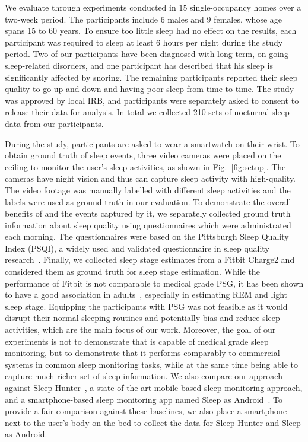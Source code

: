 We evaluate \systemname through experiments conducted in $15$ single-occupancy homes over a two-week period.  The participants include 6 males and 9 females, whose age spans 15 to 60 years. To ensure too little sleep had no effect on the results, each participant was required to sleep at least $6$ hours per night during the study period. Two of our participants have been diagnosed with long-term, on-going sleep-related disorders, and one participant has described that his sleep is significantly affected by snoring. The remaining participants reported their sleep quality to go up and down and having poor sleep from time to time. The study was approved by local IRB, and participants were separately asked to consent to release their data for analysis. In total we collected 210 sets of nocturnal sleep data from our participants. %

During the study, participants are asked to wear a smartwatch on their wrist. To obtain ground truth of sleep events, three video cameras were placed on the ceiling to monitor the user's sleep activities, as shown in Fig.~\ref{fig:setup}. The cameras have night vision and thus can capture sleep activity with high-quality. The video footage was manually labelled with different sleep activities and the labels were used as ground truth in our evaluation. To demonstrate the overall benefits of \systemname and the events captured by it, we separately collected ground truth information about sleep quality using questionnaires which were administrated each morning. The questionnaires were based on the Pittsburgh Sleep Quality Index (PSQI), a widely used and validated questionnaire in sleep quality research~\cite{buysse1989pittsburgh}. Finally, we collected sleep stage estimates from a Fitbit Charge2 and considered them as ground truth for sleep stage estimation. While the performance of Fitbit is not comparable to medical grade PSG, it has been shown to have a good association in adults~\cite{evenson2015systematic,fitbit01,fitbit02,fitbit03}, especially in estimating REM and light sleep stage. Equipping the participants with PSG was not feasible as it would disrupt their normal sleeping routines and potentially bias and reduce sleep activities, which are the main focus of our work. Moreover, the goal of our experiments is not to demonstrate that \systemname is capable of medical grade sleep monitoring, but to demonstrate that it performs comparably to commercial systems in common sleep monitoring tasks, while at the same time being able to capture much richer set of sleep information.  We also compare our approach against Sleep Hunter~\cite{gu2016sleep}, a state-of-the-art mobile-based sleep monitoring approach, and a
smartphone-based sleep monitoring app named Sleep as Android~\cite{SleepAndroid}. To provide a fair comparison against these baselines, we also place a smartphone next to the user's body on the bed to collect the data for Sleep Hunter and Sleep as Android.
	
